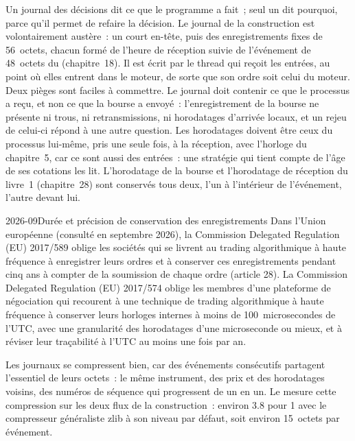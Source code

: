 Un journal des décisions dit ce que le programme a fait~; seul un  dit pourquoi, parce qu'il permet de refaire la décision.
Le journal de la construction est volontairement austère~: un court en-tête, puis des enregistrements fixes de 56~octets, chacun formé de l'heure de réception suivie de
l'événement de 48~octets du  (chapitre~18). Il est écrit par le thread qui reçoit les entrées, au point où elles
entrent dans le moteur, de sorte que son ordre soit celui du moteur. Deux pièges sont faciles à commettre. Le journal doit contenir ce que le
processus a reçu, et non ce que la bourse a envoyé~: l'enregistrement de la bourse ne présente ni trous, ni retransmissions, ni horodatages d'arrivée
locaux, et un rejeu de celui-ci répond à une autre question. Les horodatages doivent être ceux du processus lui-même, pris une seule fois, à la réception,
avec l'horloge du chapitre~5, car ce sont aussi des entrées~: une stratégie qui tient compte de l'âge de ses cotations les lit. L'horodatage de la
bourse et l'horodatage de réception du livre~1 (chapitre~28) sont conservés tous deux, l'un à l'intérieur de l'événement, l'autre devant lui.

\begin{dated}{2026-09}{Durée et précision de conservation des enregistrements}\label{dat:ll:logging-capture-and-replay:records}
Dans l'Union européenne (consulté en septembre 2026), la Commission Delegated Regulation (EU) 2017/589 oblige les sociétés qui se livrent
au trading algorithmique à haute fréquence à enregistrer leurs ordres et à conserver ces enregistrements pendant cinq ans à compter de la soumission de chaque
ordre (article 28). La Commission Delegated Regulation (EU) 2017/574 oblige les membres d'une plateforme de négociation qui recourent à une technique de trading algorithmique à haute fréquence
à conserver leurs horloges internes à moins de 100~microsecondes de l'UTC, avec une granularité des
horodatages d'une microseconde ou mieux, et à réviser leur traçabilité à l'UTC au moins une fois par an.
\end{dated}

Les journaux se compressent bien, car des événements consécutifs partagent l'essentiel de leurs octets~: le même instrument, des prix et des horodatages voisins,
des numéros de séquence qui progressent de un en un. Le  mesure cette compression sur les deux flux de
la construction~: environ 3.8 pour 1 avec le compresseur généraliste zlib à son niveau par défaut, soit environ 15~octets par événement.

